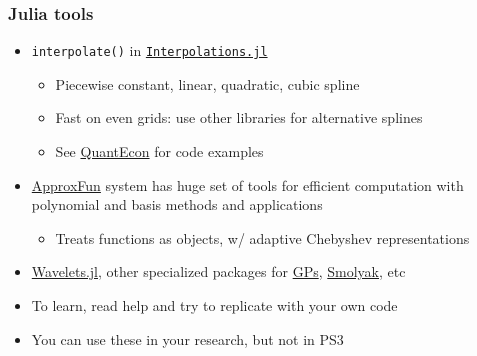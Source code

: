 \documentclass[bigger]{beamer}
\begin{document}
\begin{frame}%

\frametitle{Julia tools}

\begin{itemize}
\item \texttt{interpolate()} in \href{https://github.com/JuliaMath/Interpolations.jl}{\texttt{Interpolations.jl}}

\begin{itemize}
\item Piecewise constant, linear, quadratic, cubic spline

\item Fast on even grids: use other libraries for alternative splines

\item See \href{https://julia.quantecon.org/more_julia/general_packages.html}{QuantEcon} for code examples

\end{itemize}

\item \href{https://github.com/JuliaApproximation/ApproxFun.jl}{ApproxFun} system has huge set of tools for efficient computation with polynomial and basis methods and applications
\begin{itemize}
\item Treats functions as objects, w/ adaptive Chebyshev representations 
\end{itemize}

\item \href{https://github.com/JuliaDSP/Wavelets.jl}{Wavelets.jl}, other specialized packages for \href{https://github.com/STOR-i/GaussianProcesses.jl}{GPs}, \href{https://github.com/RJDennis/SmolyakApprox.jl}{Smolyak}, etc 

\item To learn, read help and try to replicate with your own code

\item You can use these in your research, but not in PS3
\end{itemize}


\end{frame}%
\end{document}

